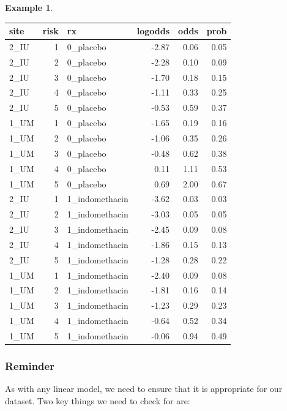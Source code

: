 \documentclass[
  openany]{book}
\theoremstyle{definition}
\theoremstyle{definition}
\newtheorem{example}{Example}[chapter]
\theoremstyle{definition}
\theoremstyle{definition}
\theoremstyle{remark}
\begin{document}
\begin{example}
\begin{tabular}{l|r|l|r|r|r}
\hline
site & risk & rx & logodds & odds & prob\\
\hline
2\_IU & 1 & 0\_placebo & -2.87 & 0.06 & 0.05\\
\hline
2\_IU & 2 & 0\_placebo & -2.28 & 0.10 & 0.09\\
\hline
2\_IU & 3 & 0\_placebo & -1.70 & 0.18 & 0.15\\
\hline
2\_IU & 4 & 0\_placebo & -1.11 & 0.33 & 0.25\\
\hline
2\_IU & 5 & 0\_placebo & -0.53 & 0.59 & 0.37\\
\hline
1\_UM & 1 & 0\_placebo & -1.65 & 0.19 & 0.16\\
\hline
1\_UM & 2 & 0\_placebo & -1.06 & 0.35 & 0.26\\
\hline
1\_UM & 3 & 0\_placebo & -0.48 & 0.62 & 0.38\\
\hline
1\_UM & 4 & 0\_placebo & 0.11 & 1.11 & 0.53\\
\hline
1\_UM & 5 & 0\_placebo & 0.69 & 2.00 & 0.67\\
\hline
2\_IU & 1 & 1\_indomethacin & -3.62 & 0.03 & 0.03\\
\hline
2\_IU & 2 & 1\_indomethacin & -3.03 & 0.05 & 0.05\\
\hline
2\_IU & 3 & 1\_indomethacin & -2.45 & 0.09 & 0.08\\
\hline
2\_IU & 4 & 1\_indomethacin & -1.86 & 0.15 & 0.13\\
\hline
2\_IU & 5 & 1\_indomethacin & -1.28 & 0.28 & 0.22\\
\hline
1\_UM & 1 & 1\_indomethacin & -2.40 & 0.09 & 0.08\\
\hline
1\_UM & 2 & 1\_indomethacin & -1.81 & 0.16 & 0.14\\
\hline
1\_UM & 3 & 1\_indomethacin & -1.23 & 0.29 & 0.23\\
\hline
1\_UM & 4 & 1\_indomethacin & -0.64 & 0.52 & 0.34\\
\hline
1\_UM & 5 & 1\_indomethacin & -0.06 & 0.94 & 0.49\\
\hline
\end{tabular}

\end{example}

\subsubsection*{Reminder}\label{reminder}

As with any linear model, we need to ensure that it is appropriate for our dataset. Two key things we need to check for are:
\end{document}
